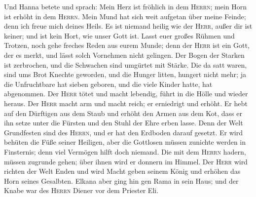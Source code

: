  Und Hanna betete und sprach: Mein Herz ist fröhlich in
dem \textsc{Herrn}; mein Horn ist erhöht in dem \textsc{Herrn}. Mein
Mund hat sich weit aufgetan über meine Feinde; denn ich freue mich
deines Heils.  Es ist niemand heilig wie der
\textsc{Herr}, außer dir ist keiner; und ist kein Hort, wie unser Gott
ist.  Lasst euer großes Rühmen und Trotzen, noch gehe
freches Reden aus eurem Munde; denn der \textsc{Herr} ist ein Gott, der
es merkt, und lässt solch Vornehmen nicht gelingen.  Der
Bogen der Starken ist zerbrochen, und die Schwachen sind umgürtet mit
Stärke.  Die da satt waren, sind ums Brot Knechte
geworden, und die Hunger litten, hungert nicht mehr; ja die Unfruchtbare
hat sieben geboren, und die viele Kinder hatte, hat abgenommen.
 Der \textsc{Herr} tötet und macht lebendig, führt in die
Hölle und wieder heraus.  Der \textsc{Herr} macht arm und
macht reich; er erniedrigt und erhöht.  Er hebt auf den
Dürftigen aus dem Staub und erhöht den Armen aus dem Kot, dass er ihn
setze unter die Fürsten und den Stuhl der Ehre erben lasse. Denn der
Welt Grundfesten sind des \textsc{Herrn}, und er hat den Erdboden darauf
gesetzt.  Er wird behüten die Füße seiner Heiligen, aber
die Gottlosen müssen zunichte werden in Finsternis; denn viel Vermögen
hilft doch niemand.  Die mit dem \textsc{Herrn} hadern,
müssen zugrunde gehen; über ihnen wird er donnern im Himmel. Der
\textsc{Herr} wird richten der Welt Enden und wird Macht geben seinem
König und erhöhen das Horn seines Gesalbten.  Elkana aber
ging hin gen Rama in sein Haus; und der Knabe war des \textsc{Herrn}
Diener vor dem Priester Eli.

